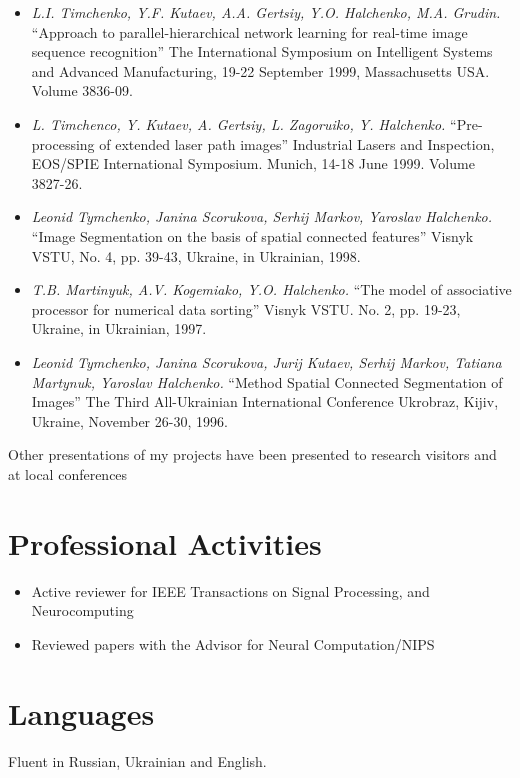 \documentclass[10pt,overlapped,line]{res}
\newcommand{\mtitle}[1]{``#1''}
\newcommand{\mauthors}[1]{ \textit{#1.}}
\newcommand{\mwhere}[1]{#1.}
\begin{document}
\begin{resume}
\begin{itemize}
  \item
     \mauthors{L.I. Timchenko, Y.F. Kutaev, A.A. Gertsiy, Y.O. Halchenko,
     M.A. Grudin}
     \mtitle{Approach to parallel-hierarchical network learning for real-time image sequence recognition}
     \mwhere{The International Symposium on Intelligent Systems and Advanced Manufacturing, 19-22 September 1999, Massachusetts USA. Volume 3836-09}

   \item
     \mauthors{L. Timchenco, Y. Kutaev, A. Gertsiy, L. Zagoruiko, Y. Halchenko}
     \mtitle{Pre-processing of extended laser path images}
     \mwhere{Industrial Lasers and Inspection, EOS/SPIE International Symposium. Munich, 14-18 June 1999. Volume 3827-26}

   \item
     \mauthors{Leonid Tymchenko, Janina Scorukova, Serhij Markov, Yaroslav Halchenko}
     \mtitle{Image Segmentation on the basis of spatial connected features}
     \mwhere{Visnyk VSTU, No. 4, pp. 39-43, Ukraine, in Ukrainian, 1998}

   \item
     \mauthors{T.B. Martinyuk, A.V. Kogemiako, Y.O. Halchenko}
     \mtitle{The model of associative processor for numerical data sorting}
     \mwhere{ Visnyk VSTU. No. 2, pp. 19-23, Ukraine, in Ukrainian, 1997}

   \item
     \mauthors{Leonid Tymchenko, Janina Scorukova, Jurij Kutaev, Serhij Markov, Tatiana Martynuk, Yaroslav Halchenko}
     \mtitle{Method Spatial Connected Segmentation of Images}
     \mwhere{The Third All-Ukrainian International Conference Ukrobraz, Kijiv, Ukraine, November 26-30, 1996}
 \end{itemize}

 Other presentations of my projects have been presented to research visitors and at local conferences

\section{Professional Activities}
\begin{itemize}
\item Active reviewer for IEEE Transactions on Signal Processing, and Neurocomputing
\item Reviewed papers with the Advisor for Neural Computation/NIPS
\end{itemize}


 \section{Languages}
 Fluent in Russian, Ukrainian and English.


\end{resume}
\end{document}
